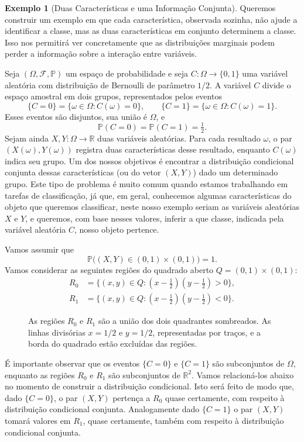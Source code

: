 \documentclass[12pt,portuguese]{article}
\theoremstyle{definition}
\newtheorem{example}[example]{Exemplo}
\theoremstyle{plainexercise}
\theoremstyle{starredexercise}
\theoremstyle{definition}
\begin{document}
\begin{example}[Duas Características e uma Informação Conjunta]\label{ex:classes-mesmas-marginais}
Queremos construir um exemplo em que cada característica, observada sozinha,
não ajude a identificar a classe, mas as duas características em conjunto
determinem a classe. Isso nos permitirá ver concretamente que as distribuições
marginais podem perder a informação sobre a interação entre variáveis.

Seja $(\Omega,\mathcal{F},\mathbb{P})$ um espaço de probabilidade e seja
$C:\Omega\to\{0,1\}$ uma variável aleatória com distribuição de Bernoulli
de parâmetro $1/2$. A variável $C$ divide o espaço amostral em dois grupos,
representados pelos eventos
\[
  \{C=0\}=\{\omega\in\Omega:C(\omega)=0\},
  \qquad
  \{C=1\}=\{\omega\in\Omega:C(\omega)=1\}.
\]
Esses eventos são disjuntos, sua união é $\Omega$, e
\[
  \mathbb{P}(C=0)=\mathbb{P}(C=1)=\tfrac12.
\]
Sejam ainda $X,Y:\Omega\to\mathbb{R}$ duas variáveis aleatórias. Para cada
resultado $\omega$, o par $(X(\omega),Y(\omega))$ registra duas características
desse resultado, enquanto $C(\omega)$ indica seu grupo. Um dos nossos objetivos é encontrar
a distribuição condicional conjunta dessas características (ou do vetor $(X,Y)$) 
dado um determinado grupo.
Este tipo de problema é muito comum quando estamos trabalhando em tarefas de classificação, 
já que, em geral, conhecemos algumas características do objeto que queremos
classificar, neste nosso exemplo seriam as variáveis aleatórias $X$ e $Y$, 
e queremos, com base nesses valores, inferir a que classe, indicada pela
variável aleatória $C$, nosso objeto pertence.

Vamos assumir que 
\[ 
\mathbb{P}\big( (X,Y)\in (0,1)\times (0,1)\big) =1.
\] 
Vamos considerar as seguintes regiões do quadrado aberto
$Q=(0,1)\times(0,1)$:
\begin{align*}
  R_0&=\bigl\{(x,y)\in Q :(x-\tfrac12)(y-\tfrac12)>0\bigr\},
  \\[0.3cm]
  R_1&=\bigl\{(x,y)\in Q :(x-\tfrac12)(y-\tfrac12)<0\bigr\}.
\end{align*}
\begin{figure}[H]
\centering

\caption{As regiões $R_0$ e $R_1$ são a união dos dois quadrantes sombreados.
As linhas divisórias $x=1/2$ e $y=1/2$, representadas por traços, e a borda
do quadrado estão excluídas das regiões.}
\label{fig:regioes-classificacao}
\end{figure}

É importante observar que os eventos $\{C=0\}$ e $\{C=1\}$ são subconjuntos de $\Omega$, 
enquanto as regiões $R_0$ e $R_1$ são subconjuntos de $\mathbb{R}^2$. 
Vamos relacioná-los abaixo no momento de construir a distribuição
condicional. Isto será feito de modo que, dado $\{C=0\}$, o par $(X,Y)$ pertença a $R_0$ quase certamente,
com respeito à distribuição condicional conjunta. 
Analogamente dado $\{C=1\}$ o par $(X,Y)$ tomará valores em $R_1$, quase certamente,
também com respeito à distribuição condicional conjunta.  


\end{example}
\end{document}
